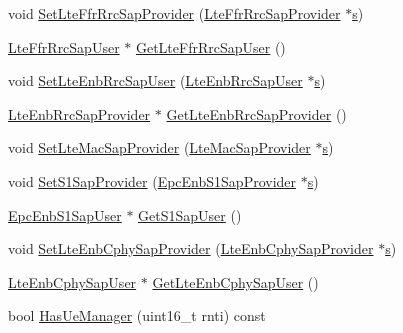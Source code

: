 \begin{DoxyCompactItemize}
\item 
void \hyperlink{classns3_1_1LteEnbRrc_ae1730e7dee17553d2cddb26fdbc9c829}{Set\+Lte\+Ffr\+Rrc\+Sap\+Provider} (\hyperlink{classns3_1_1LteFfrRrcSapProvider}{Lte\+Ffr\+Rrc\+Sap\+Provider} $\ast$\hyperlink{generate__test__data__lte__sinr_8m_ad83eeb3a142285d1243a08c6b7026df8}{s})
\item 
\hyperlink{classns3_1_1LteFfrRrcSapUser}{Lte\+Ffr\+Rrc\+Sap\+User} $\ast$ \hyperlink{classns3_1_1LteEnbRrc_abaab35643eb9d7218a50303404d7bdce}{Get\+Lte\+Ffr\+Rrc\+Sap\+User} ()
\item 
void \hyperlink{classns3_1_1LteEnbRrc_aa3d8b88d6a7b055a19c05e93ced842a1}{Set\+Lte\+Enb\+Rrc\+Sap\+User} (\hyperlink{classns3_1_1LteEnbRrcSapUser}{Lte\+Enb\+Rrc\+Sap\+User} $\ast$\hyperlink{generate__test__data__lte__sinr_8m_ad83eeb3a142285d1243a08c6b7026df8}{s})
\item 
\hyperlink{classns3_1_1LteEnbRrcSapProvider}{Lte\+Enb\+Rrc\+Sap\+Provider} $\ast$ \hyperlink{classns3_1_1LteEnbRrc_a0a220626da82f0a267db8316f72dd283}{Get\+Lte\+Enb\+Rrc\+Sap\+Provider} ()
\item 
void \hyperlink{classns3_1_1LteEnbRrc_a928ababe93932336c331aac5ba711ea1}{Set\+Lte\+Mac\+Sap\+Provider} (\hyperlink{classns3_1_1LteMacSapProvider}{Lte\+Mac\+Sap\+Provider} $\ast$\hyperlink{generate__test__data__lte__sinr_8m_ad83eeb3a142285d1243a08c6b7026df8}{s})
\item 
void \hyperlink{classns3_1_1LteEnbRrc_abb7e58dfd8bde6997af4582b969468a6}{Set\+S1\+Sap\+Provider} (\hyperlink{classns3_1_1EpcEnbS1SapProvider}{Epc\+Enb\+S1\+Sap\+Provider} $\ast$\hyperlink{generate__test__data__lte__sinr_8m_ad83eeb3a142285d1243a08c6b7026df8}{s})
\item 
\hyperlink{classns3_1_1EpcEnbS1SapUser}{Epc\+Enb\+S1\+Sap\+User} $\ast$ \hyperlink{classns3_1_1LteEnbRrc_a37da613e2b716fc938df67184bafeee5}{Get\+S1\+Sap\+User} ()
\item 
void \hyperlink{classns3_1_1LteEnbRrc_ae2249583a110c53d9d6648eed88e2329}{Set\+Lte\+Enb\+Cphy\+Sap\+Provider} (\hyperlink{classns3_1_1LteEnbCphySapProvider}{Lte\+Enb\+Cphy\+Sap\+Provider} $\ast$\hyperlink{generate__test__data__lte__sinr_8m_ad83eeb3a142285d1243a08c6b7026df8}{s})
\item 
\hyperlink{classns3_1_1LteEnbCphySapUser}{Lte\+Enb\+Cphy\+Sap\+User} $\ast$ \hyperlink{classns3_1_1LteEnbRrc_a4e3fe8ef7607fb7dcc88d97b001011cc}{Get\+Lte\+Enb\+Cphy\+Sap\+User} ()
\item 
bool \hyperlink{classns3_1_1LteEnbRrc_aa7afedeb40e644af34e3ef45e19ae0f5}{Has\+Ue\+Manager} (uint16\+\_\+t rnti) const 

\end{DoxyCompactItemize}
